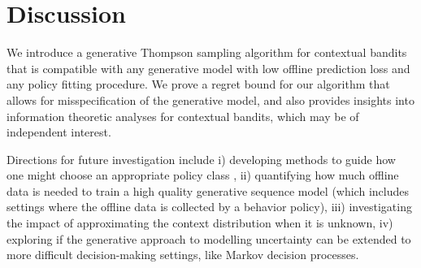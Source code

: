 \section{Discussion}
We introduce a generative Thompson sampling algorithm for contextual bandits that is compatible with any generative model with low offline prediction loss and any policy fitting procedure. We prove a regret bound for our algorithm that allows for misspecification of the generative model, and also provides insights into information theoretic analyses for contextual bandits, which may be of independent interest.

Directions for future investigation include i) developing methods to guide how one might choose an appropriate policy class \citep{foster2020open}, ii) quantifying how much offline data is needed to train a high quality generative sequence model (which includes settings where the offline data is collected by a behavior policy), iii) investigating the impact of approximating the context distribution when it is unknown, iv) exploring if the generative approach to modelling uncertainty can be extended to more difficult decision-making settings, like Markov decision processes.